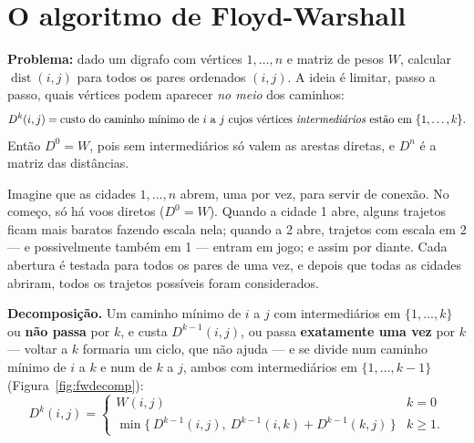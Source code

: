 \begin{figura}
\end{figura}

\section{O algoritmo de Floyd-Warshall}\label{sec:fwalg}
\textbf{Problema:} dado um digrafo com vértices $1,\dots,n$ e matriz de pesos $W$, calcular $\operatorname{dist}(i,j)$ para todos os pares ordenados $(i,j)$. A ideia é limitar, passo a passo, quais vértices podem aparecer \emph{no meio} dos caminhos:
\[
D^k(i,j)=\text{custo do caminho mínimo de }i\text{ a }j\text{ cujos vértices \emph{intermediários} estão em }\{1,\dots,k\}.
\]
Então $D^0=W$, pois sem intermediários só valem as arestas diretas, e $D^n$ é a matriz das distâncias.

\begin{intuicao}
Imagine que as cidades $1,\dots,n$ abrem, uma por vez, para servir de conexão. No começo, só há voos diretos ($D^0=W$). Quando a cidade 1 abre, alguns trajetos ficam mais baratos fazendo escala nela; quando a 2 abre, trajetos com escala em 2 --- e possivelmente também em 1 --- entram em jogo; e assim por diante. Cada abertura é testada para todos os pares de uma vez, e depois que todas as cidades abriram, todos os trajetos possíveis foram considerados.
\end{intuicao}

\textbf{Decomposição.} Um caminho mínimo de $i$ a $j$ com intermediários em $\{1,\dots,k\}$ ou \textbf{não passa} por $k$, e custa $D^{k-1}(i,j)$, ou passa \textbf{exatamente uma vez} por $k$ --- voltar a $k$ formaria um ciclo, que não ajuda --- e se divide num caminho mínimo de $i$ a $k$ e num de $k$ a $j$, ambos com intermediários em $\{1,\dots,k-1\}$ (Figura~\ref{fig:fwdecomp}):
\[
D^k(i,j)=\begin{cases}W(i,j) & k=0\\ \min\{\,D^{k-1}(i,j),\ D^{k-1}(i,k)+D^{k-1}(k,j)\,\} & k\ge1.\end{cases}
\]

